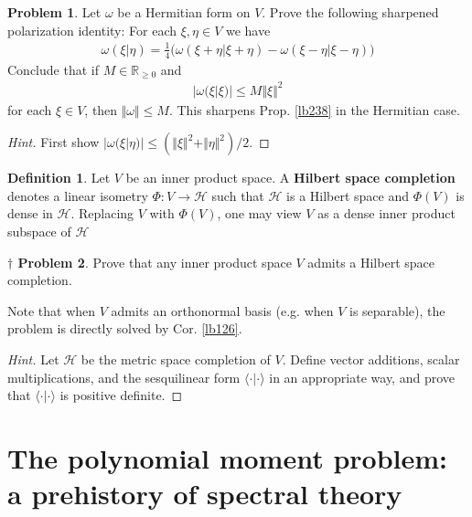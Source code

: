 \documentclass[12pt,b5paper,notitlepage]{article}
\theoremstyle{definition}
\newtheorem{df}{Definition}[subsection]
\newtheorem{prob}{\color{red}Problem}[section]
\newtheorem{dprob}[prob]{\color{red}$\dagger$ Problem}
\theoremstyle{plain}
\newcommand{\bk}[1]{\langle {#1}\rangle}
\newcommand{\Rbb}{\mathbb R}
\newcommand{\MH}{\mathcal H}
\numberwithin{equation}{section}
\begin{document}
\begin{prob}
Let $\omega$ be a Hermitian form on $V$. Prove the following sharpened polarization identity: For each $\xi,\eta\in V$ we have
\begin{align}\label{eq145}
\omega(\xi|\eta)=\frac 14\big(\omega(\xi+\eta|\xi+\eta)-\omega(\xi-\eta|\xi-\eta)\big)
\end{align}
Conclude that if $M\in\Rbb_{\geq0}$ and
\begin{align*}
|\omega(\xi|\xi)|\leq M\Vert\xi\Vert^2
\end{align*}
for each $\xi\in V$, then $\Vert\omega\Vert\leq M$. This sharpens Prop. \ref{lb238} in the Hermitian case.
\end{prob}


\begin{proof}[Hint]
First show $|\omega(\xi|\eta)|\leq (\Vert\xi\Vert^2+\Vert\eta\Vert^2)/2$.
\end{proof}



\begin{df}
Let $V$ be an inner product space. A \textbf{Hilbert space completion}  denotes a linear isometry $\Phi:V\rightarrow\MH$ such that $\MH$ is a Hilbert space and $\Phi(V)$ is dense in $\MH$. Replacing $V$ with $\Phi(V)$, one may view $V$ as a dense inner product subspace of $\MH$
\end{df}


\begin{dprob}\label{lb350}
Prove that any inner product space $V$ admits a Hilbert space completion.
\end{dprob}

Note that when $V$ admits an orthonormal basis (e.g. when $V$ is separable), the problem is directly solved by Cor. \ref{lb126}.

\begin{proof}[Hint]
Let $\MH$ be the metric space completion of $V$. Define vector additions, scalar multiplications, and the sesquilinear form $\bk{\cdot|\cdot}$ in an appropriate way, and prove that $\bk{\cdot|\cdot}$ is positive definite. 
\end{proof}




\newpage



\section{The polynomial moment problem: a prehistory of spectral theory}\label{lb114}
\end{document}
